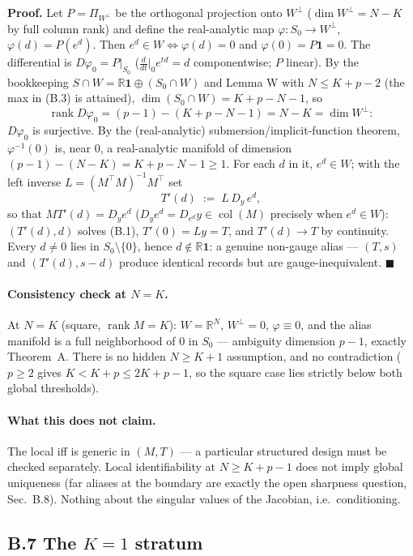 \noindent\textbf{Proof.} Let $P=\Pi_{W^\perp}$ be the orthogonal projection onto $W^\perp$ ($\dim W^\perp=N-K$ by full column rank) and define the real-analytic map $\varphi:S_0\to W^\perp$, $\varphi(d)=P(e^{d})$. Then $e^{d}\in W\Leftrightarrow\varphi(d)=0$ and $\varphi(0)=P\mathbf 1=0$. The differential is $D\varphi_0=P|_{S_0}$ ($\tfrac{d}{dt}\big|_0e^{td}=d$ componentwise; $P$ linear). By the bookkeeping $S\cap W=\mathbb R\mathbf 1\oplus(S_0\cap W)$ and Lemma W with $N\le K+p-2$ (the max in (B.3) is attained), $\dim(S_0\cap W)=K+p-N-1$, so
\[
\operatorname{rank}D\varphi_0=(p-1)-(K+p-N-1)=N-K=\dim W^\perp:
\]
$D\varphi_0$ is surjective. By the (real-analytic) submersion/implicit-function theorem, $\varphi^{-1}(0)$ is, near $0$, a real-analytic manifold of dimension $(p-1)-(N-K)=K+p-N-1\ge1$. For each $d$ in it, $e^{d}\in W$; with the left inverse $L=(M^\top M)^{-1}M^\top$ set
\[
T'(d)\;:=\;L\,D_y\,e^{d},
\]
so that $MT'(d)=D_ye^{d}$ ($D_ye^{d}=D_{e^{d}}y\in\operatorname{col}(M)$ precisely when $e^{d}\in W$): $(T'(d),d)$ solves (B.1), $T'(0)=Ly=T$, and $T'(d)\to T$ by continuity. Every $d\neq0$ lies in $S_0\setminus\{0\}$, hence $d\notin\mathbb R\mathbf 1$: a genuine non-gauge alias --- $(T,s)$ and $(T'(d),s-d)$ produce identical records but are gauge-inequivalent. \hfill$\blacksquare$

\paragraph{Consistency check at $N=K$.} At $N=K$ (square, $\operatorname{rank}M=K$): $W=\mathbb R^N$, $W^\perp=0$, $\varphi\equiv0$, and the alias manifold is a full neighborhood of $0$ in $S_0$ --- ambiguity dimension $p-1$, exactly Theorem~A. There is no hidden $N\ge K+1$ assumption, and no contradiction ($p\ge2$ gives $K<K+p\le2K+p-1$, so the square case lies strictly below both global thresholds).

\paragraph{What this does not claim.} The local iff is generic in $(M,T)$ --- a particular structured design must be checked separately. Local identifiability at $N\ge K+p-1$ does not imply global uniqueness (far aliases at the boundary are exactly the open sharpness question, Sec.~B.8). Nothing about the singular values of the Jacobian, i.e.\ conditioning.

\subsection{B.7 The \texorpdfstring{$K=1$}{K=1} stratum}

